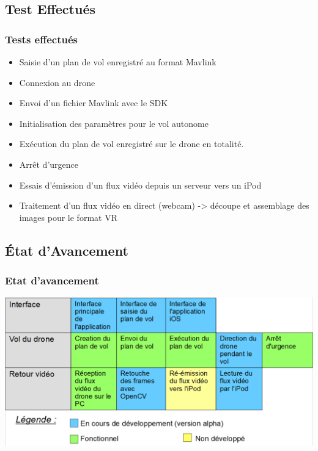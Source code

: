 \documentclass{beamer}
\begin{document}
	
	\begin{frame}
		\section{Test Effectués}
		\begin{center}
		\frametitle{Tests effectués}
           	\begin{itemize}
           	    \item Saisie d'un plan de vol enregistré au format Mavlink
                \item Connexion au drone
                \item Envoi d'un fichier Mavlink avec le SDK
                \item Initialisation des paramètres pour le vol autonome
                \item Exécution du plan de vol enregistré sur le drone en totalité.
                 \item Arrêt d'urgence
                \item Essais d'émission d'un flux vidéo depuis un serveur vers un iPod
                \item Traitement d'un flux vidéo en direct (webcam) -> découpe et assemblage des images pour le format VR 
            \end{itemize}
		\end{center}
	\end{frame}


	\begin{frame}
		\section{État d'Avancement}
		\begin{center}
		\frametitle{Etat d'avancement}
         \includegraphics[scale=0.35]{Avancement_projet.PNG}
        \end{center}
	\end{frame}
	
\end{document}
